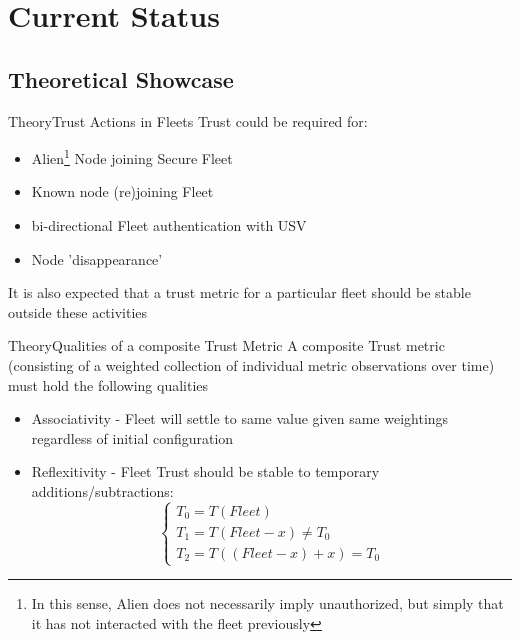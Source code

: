 \documentclass[10pt]{beamer}
\begin{document}
\section{Current Status}

\subsection{Theoretical Showcase}
\begin{frame}{Theory}{Trust Actions in Fleets}
  Trust could be required for:
  \begin{itemize}
    \item Alien\footnote{In this sense, Alien does not necessarily imply unauthorized, but simply that it has not interacted with the fleet previously} Node joining Secure Fleet
    \item Known node (re)joining Fleet
    \item bi-directional Fleet authentication with USV
    \item Node 'disappearance'
  \end{itemize}
  It is also expected that a trust metric for a particular fleet should be stable outside these activities
\end{frame}

\begin{frame}{Theory}{Qualities of a composite Trust Metric}
  A composite Trust metric (consisting of a weighted collection of individual metric observations over time) must hold the following qualities
  \begin{itemize}
    \item Associativity - Fleet will settle to same value given same weightings regardless of initial configuration
    \item Reflexitivity - Fleet Trust should be stable to temporary additions/subtractions: 
      \begin{equation}\begin{cases}
        T_0=T(Fleet)\\
        T_1=T(Fleet-x)\neq T_0\\
        T_2=T((Fleet-x)+x)=T_0
      \end{cases}\end{equation}
  \end{itemize}
\end{frame}
\end{document}
